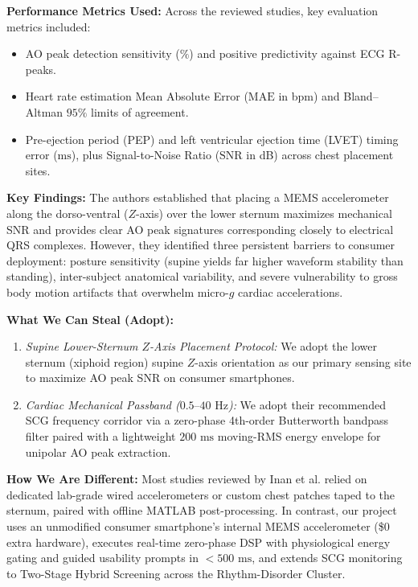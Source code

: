 \textbf{Performance Metrics Used:} Across the reviewed studies, key evaluation metrics included:
\begin{itemize}
    \item AO peak detection sensitivity ($\%$) and positive predictivity against ECG R-peaks.
    \item Heart rate estimation Mean Absolute Error ($\text{MAE}$ in bpm) and Bland--Altman $95\%$ limits of agreement.
    \item Pre-ejection period (PEP) and left ventricular ejection time (LVET) timing error ($\text{ms}$), plus Signal-to-Noise Ratio ($\text{SNR}$ in dB) across chest placement sites.
\end{itemize}

\textbf{Key Findings:} The authors established that placing a MEMS accelerometer along the dorso-ventral ($Z$-axis) over the lower sternum maximizes mechanical SNR and provides clear AO peak signatures corresponding closely to electrical QRS complexes. However, they identified three persistent barriers to consumer deployment: posture sensitivity (supine yields far higher waveform stability than standing), inter-subject anatomical variability, and severe vulnerability to gross body motion artifacts that overwhelm micro-$g$ cardiac accelerations.

\textbf{What We Can Steal (Adopt):} 
\begin{enumerate}
    \item \textit{Supine Lower-Sternum $Z$-Axis Placement Protocol:} We adopt the lower sternum (xiphoid region) supine $Z$-axis orientation as our primary sensing site to maximize AO peak SNR on consumer smartphones.
    \item \textit{Cardiac Mechanical Passband ($0.5\text{--}40\text{ Hz}$):} We adopt their recommended SCG frequency corridor via a zero-phase 4th-order Butterworth bandpass filter paired with a lightweight $200\text{ ms}$ moving-RMS energy envelope for unipolar AO peak extraction.
\end{enumerate}

\textbf{How We Are Different:} Most studies reviewed by Inan et al. relied on dedicated lab-grade wired accelerometers or custom chest patches taped to the sternum, paired with offline MATLAB post-processing. In contrast, our project uses an unmodified consumer smartphone's internal MEMS accelerometer (\$0 extra hardware), executes real-time zero-phase DSP with physiological energy gating and guided usability prompts in $< 500\text{ ms}$, and extends SCG monitoring to Two-Stage Hybrid Screening across the Rhythm-Disorder Cluster.

